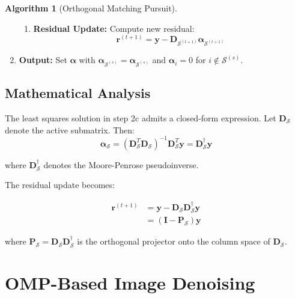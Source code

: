 \documentclass[12pt]{article}
\renewcommand{\vec}[1]{\mathbf{#1}}
\theoremstyle{definition}
\newtheorem{algorithm}[theorem]{Algorithm}
\begin{document}
\begin{algorithm}[Orthogonal Matching Pursuit]
\begin{enumerate}[label=\textbf{\arabic*.}]
\begin{enumerate}[label=\textbf{(\alph*)}]
                  \item \textbf{Residual Update:} Compute new residual:
                        \begin{equation}
                            \vec{r}^{(t+1)} = \vec{y} - \mathbf{D}_{\mathcal{S}^{(t+1)}}\vec{\alpha}_{\mathcal{S}^{(t+1)}}
                        \end{equation}
              \end{enumerate}

        \item \textbf{Output:} Set $\vec{\alpha}$ with $\vec{\alpha}_{\mathcal{S}^{(s)}} = \vec{\alpha}_{\mathcal{S}^{(s)}}$ and $\vec{\alpha}_i = 0$ for $i \notin \mathcal{S}^{(s)}$.
    \end{enumerate}
\end{algorithm}

\subsection{Mathematical Analysis}
\label{subsec:mathematical_analysis}

The least squares solution in step 2c admits a closed-form expression. Let $\mathbf{D}_{\mathcal{S}}$ denote the active submatrix. Then:
\begin{equation}
    \vec{\alpha}_{\mathcal{S}} = (\mathbf{D}_{\mathcal{S}}^T \mathbf{D}_{\mathcal{S}})^{-1} \mathbf{D}_{\mathcal{S}}^T \vec{y}
    = \mathbf{D}_{\mathcal{S}}^{\dagger} \vec{y}
\end{equation}

\noindent where $\mathbf{D}_{\mathcal{S}}^{\dagger}$ denotes the Moore-Penrose pseudoinverse.

\vspace{1em}

The residual update becomes:

\begin{align}
    \vec{r}^{(t+1)} & = \vec{y} - \mathbf{D}_{\mathcal{S}} \mathbf{D}_{\mathcal{S}}^{\dagger} \vec{y} \\
                    & = (\mathbf{I} - \mathbf{P}_{\mathcal{S}}) \vec{y}
\end{align}

where $\mathbf{P}_{\mathcal{S}} = \mathbf{D}_{\mathcal{S}} \mathbf{D}_{\mathcal{S}}^{\dagger}$ is the orthogonal projector onto the column space of $\mathbf{D}_{\mathcal{S}}$.

\newpage

\section{OMP-Based Image Denoising}
\label{sec:omp_denoising}
\end{document}
